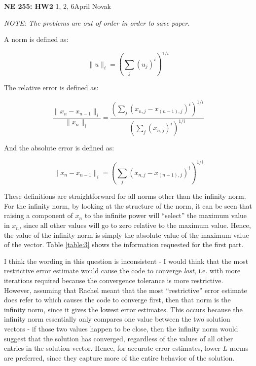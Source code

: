 \documentclass[10pt]{article}
\newcommand*\circled[1]{\tikz[baseline=(char.base)]{
            \node[shape=circle,draw,inner sep=2pt] (char) {#1};}}
\begin{document}
\textbf{NE 255: HW2} 1, 2, 6\hfill April Novak\newline

\textit{NOTE: The problems are out of order in order to save paper.}\newline

\circled{3}\newline

A norm is defined as:

\begin{equation}
\|u\|_i=\left(\sum_{j}^{}(u_j)^i\right)^{1/i}
\end{equation}

The relative error is defined as:

\begin{equation}
\frac{\|x_n-x_{n-1}\|_i}{\|x_n\|_i}=\frac{\left(\sum_{j}^{}(x_{n,j}-x_{(n-1),j})^i\right)^{1/i}}{\left(\sum_{j}^{}(x_{n,j})^i\right)^{1/i}}
\end{equation}

And the absolute error is defined as:

\begin{equation}
\|x_n-x_{n-1}\|_i=\left(\sum_{j}^{}(x_{n,j}-x_{(n-1),j})^i\right)^{1/i}
\end{equation}

These definitions are straightforward for all norms other than the infinity norm. For the infinity norm, by looking at the structure of the norm, it can be seen that raising a component of \(x_n\) to the infinite power will ``select'' the maximum value in \(x_n\), since all other values will go to zero relative to the maximum value. Hence, the value of the infinity norm is simply the absolute value of the maximum value of the vector. Table \ref{table:3} shows the information requested for the first part. 

I think the wording in this question is inconsistent - I would think that the most restrictive error estimate would cause the code to converge \textit{last}, i.e. with more iterations required because the convergence tolerance is more restrictive. However, assuming that Rachel meant that the most ``restrictive'' error estimate does refer to which causes the code to converge first, then that norm is the infinity norm, since it gives the lowest error estimates. This occurs because the infinity norm essentially only compares one value between the two solution vectors - if those two values happen to be close, then the infinity norm would suggest that the solution has converged, regardless of the values of all other entries in the solution vector. Hence, for accurate error estimates, lower \(L\) norms are preferred, since they capture more of the entire behavior of the solution.
\end{document}
